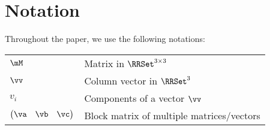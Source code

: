 
%
\section{Notation} %
\label{sec:pev_notation}
% 
Throughout the paper, we use the following notations:
%

%
\noindent
\begin{tabular}{ll}
$\mM$ & Matrix in $\RRSet^{3 \times 3}$\\
$\vv$ & Column vector in $\RRSet^3$ \\
$v_i$ & Components of a vector $\vv$\\
$\begin{pmatrix} \va & \vb & \vc \end{pmatrix}$ & Block matrix of multiple matrices/vectors \\
\end{tabular}
% 
